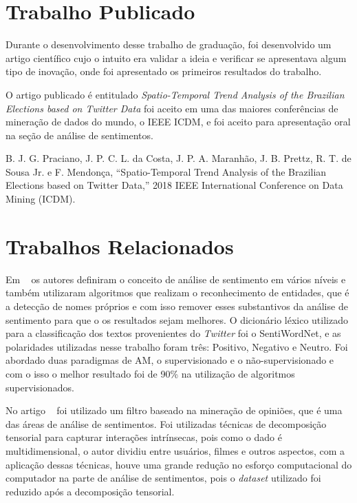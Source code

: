\section{Trabalho Publicado}

Durante o desenvolvimento desse trabalho de graduação, foi desenvolvido um artigo científico cujo o intuito era validar a ideia e verificar se apresentava
algum tipo de inovação, onde foi apresentado os primeiros resultados do trabalho. 

O artigo publicado é entitulado \textit{Spatio-Temporal Trend Analysis of the Brazilian Elections based on Twitter Data} foi aceito em uma das maiores
conferências de mineração de dados do mundo, o \acrshort{IEEE} \acrshort{ICDM}, e foi aceito para apresentação oral na seção de análise de sentimentos.

B. J. G. Praciano, J. P. C. L. da Costa, J. P. A. Maranhão, J. B. Prettz, R. T. de Sousa Jr. e F. Mendonça, “Spatio-Temporal Trend Analysis of the Brazilian Elections based on Twitter Data,”  2018 IEEE International Conference on Data Mining (ICDM).


\section{Trabalhos Relacionados}

Em ~\cite{8474783} os autores definiram o conceito de análise de sentimento em vários níveis e também utilizaram algoritmos que realizam o reconhecimento de entidades, que é
a detecção de nomes próprios e com isso remover esses substantivos da análise de sentimento para que o os resultados sejam melhores. O dicionário léxico utilizado para a classificação
dos textos provenientes do \textit{Twitter} foi o SentiWordNet, e as polaridades utilizadas nesse trabalho foram três: Positivo, Negativo e Neutro. Foi abordado duas paradigmas
de \acrshort{AM}, o supervisionado e o não-supervisionado e com o isso o melhor resultado foi de 90\% na utilização de algoritmos supervisionados.


No artigo ~\cite{6413737} foi utilizado um filtro baseado na mineração de opiniões, que é uma das áreas de análise de sentimentos. Foi utilizadas técnicas de decomposição 
tensorial para capturar interações intrínsecas, pois como o dado é multidimensional, o autor dividiu entre usuários, filmes e outros aspectos, com a aplicação dessas técnicas,
houve uma grande redução no esforço computacional do computador na parte de análise de sentimentos, pois o \textit{dataset} utilizado foi reduzido após a decomposição tensorial.



